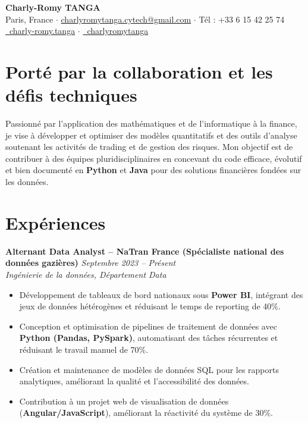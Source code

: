 \documentclass[10pt, letterpaper]{article}
\begin{document}
\begin{center}
    {\Large \textbf{Charly-Romy TANGA}}\\[3pt]
    {\small Paris, France \quad$\cdot$\quad 
    \href{mailto:charlyromytanga.cytech@gmail.com}{charlyromytanga.cytech@gmail.com} \quad$\cdot$\quad
    Tél : +33 6 15 42 25 74}\\[3pt]
    \href{https://linkedin.com/in/charly-romy.tanga}{\faLinkedinIn\ charly-romy.tanga} \quad$\cdot$\quad
    \href{https://github.com/charlyromytanga}{\faGithub\ charlyromytanga}
\end{center}

\vspace{0.2cm}

\section*{Porté par la collaboration et les défis techniques}
Passionné par l’application des mathématiques et de l’informatique à la finance, je vise à développer et optimiser des modèles quantitatifs et des outils d’analyse soutenant les activités de trading et de gestion des risques. Mon objectif est de contribuer à des équipes pluridisciplinaires en concevant du code efficace, évolutif et bien documenté en \textbf{Python} et \textbf{Java} pour des solutions financières fondées sur les données.

\section*{Expériences}

\textbf{Alternant Data Analyst – NaTran France (Spécialiste national des données gazières)} \hfill \textit{Septembre 2023 – Présent}\\
\textit{Ingénierie de la données, Département Data}
\begin{itemize}
    \item Développement de tableaux de bord nationaux sous \textbf{Power BI}, intégrant des jeux de données hétérogènes et réduisant le temps de reporting de 40\%.
    \item Conception et optimisation de pipelines de traitement de données avec \textbf{Python (Pandas, PySpark)}, automatisant des tâches récurrentes et réduisant le travail manuel de 70\%.
    \item Création et maintenance de modèles de données SQL pour les rapports analytiques, améliorant la qualité et l’accessibilité des données.
    \item Contribution à un projet web de visualisation de données (\textbf{Angular/JavaScript}), améliorant la réactivité du système de 30\%.
\end{itemize}
\end{document}
